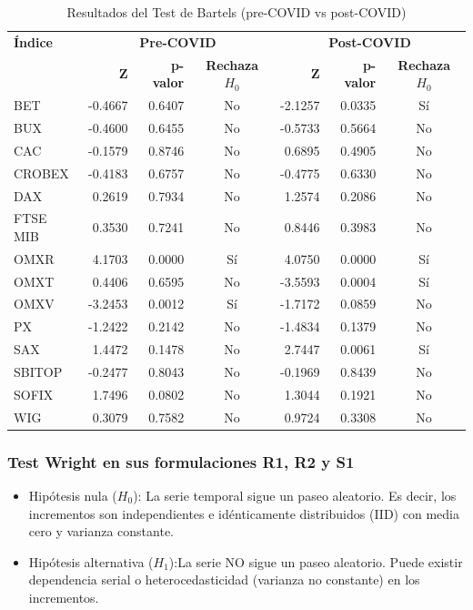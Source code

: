 \documentclass[12pt]{article}
\begin{document}
\begin{table}[H]
\centering
\small
\caption{Resultados del Test de Bartels (pre-COVID vs post-COVID)}
\begin{tabular}{|l|r|r|c|r|r|c|}
\hline
\textbf{Índice} & \multicolumn{3}{c|}{\textbf{Pre-COVID}} & \multicolumn{3}{c|}{\textbf{Post-COVID}} \\
\cline{2-7}
 & \textbf{Z} & \textbf{p-valor} & \textbf{Rechaza $H_0$} & \textbf{Z} & \textbf{p-valor} & \textbf{Rechaza $H_0$} \\
\hline
BET       & -0.4667 & 0.6407 & No  & -2.1257 & 0.0335 & Sí \\
BUX       & -0.4600 & 0.6455 & No  & -0.5733 & 0.5664 & No \\
CAC       & -0.1579 & 0.8746 & No  &  0.6895 & 0.4905 & No \\
CROBEX    & -0.4183 & 0.6757 & No  & -0.4775 & 0.6330 & No \\
DAX       &  0.2619 & 0.7934 & No  &  1.2574 & 0.2086 & No \\
FTSE MIB  &  0.3530 & 0.7241 & No  &  0.8446 & 0.3983 & No \\
OMXR      &  4.1703 & 0.0000 & Sí  &  4.0750 & 0.0000 & Sí \\
OMXT      &  0.4406 & 0.6595 & No  & -3.5593 & 0.0004 & Sí \\
OMXV      & -3.2453 & 0.0012 & Sí  & -1.7172 & 0.0859 & No \\
PX        & -1.2422 & 0.2142 & No  & -1.4834 & 0.1379 & No \\
SAX       &  1.4472 & 0.1478 & No  &  2.7447 & 0.0061 & Sí \\
SBITOP    & -0.2477 & 0.8043 & No  & -0.1969 & 0.8439 & No \\
SOFIX     &  1.7496 & 0.0802 & No  &  1.3044 & 0.1921 & No \\
WIG       &  0.3079 & 0.7582 & No  &  0.9724 & 0.3308 & No \\
\hline
\end{tabular}
\end{table}

\subsubsection {\large Test Wright en sus formulaciones R1, R2 y S1}


\begin{itemize}
\item {Hipótesis nula ($H_0$):} La serie temporal sigue un paseo aleatorio. Es decir, los incrementos son independientes e idénticamente distribuidos (IID) con media cero y varianza constante.\\

\item {Hipótesis alternativa ($H_1$):}La serie NO sigue un paseo aleatorio. Puede existir dependencia serial o heterocedasticidad (varianza no constante) en los incrementos.\\
\end{itemize}
\end{document}
